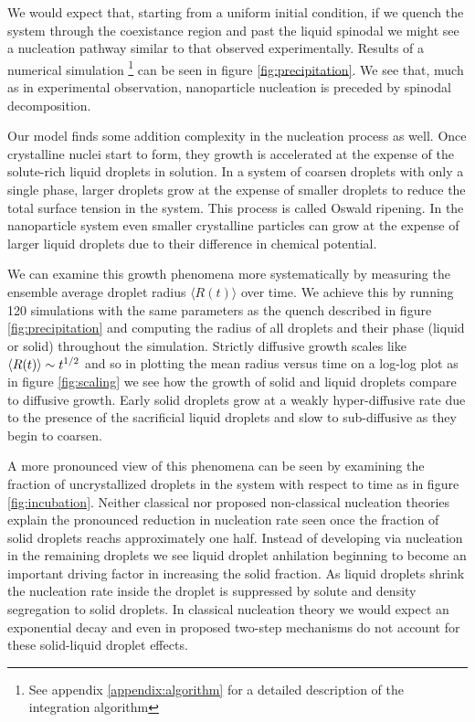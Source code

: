We would expect that, starting from a uniform initial condition, if we quench
the system through the coexistance region and past the liquid spinodal we might
see a nucleation pathway similar to that observed experimentally. Results of a
numerical simulation \footnote{See appendix \ref{appendix:algorithm} for a
detailed description of the integration algorithm} can be seen in figure
\ref{fig:precipitation}. We see that, much as in experimental observation,
nanoparticle nucleation is preceded by spinodal decomposition.


Our model finds some addition complexity in the nucleation process as well.
Once crystalline nuclei start to form, they growth is accelerated at the
expense of the solute-rich liquid droplets in solution. In a system of coarsen
droplets with only a single phase, larger droplets grow at the expense of
smaller droplets to reduce the total surface tension in the system. This
process is called Oswald ripening. In the nanoparticle system even smaller
crystalline particles can grow at the expense of larger liquid droplets due to
their difference in chemical potential.


We can examine this growth phenomena more systematically by measuring the
ensemble average droplet radius $\langle R(t) \rangle$ over time. We achieve
this by running 120 simulations with the same parameters as the quench
described in figure \ref{fig:precipitation} and computing the radius of all
droplets and their phase (liquid or solid) throughout the simulation. Strictly
diffusive growth scales like $\left\langle R(t) \right\rangle \sim t^{1/2}$ and so in plotting the
mean radius versus time on a log-log plot as in figure \ref{fig:scaling} we see
how the growth of solid and liquid droplets compare to diffusive growth. Early
solid droplets grow at a weakly hyper-diffusive rate due to the presence of
the sacrificial liquid droplets and slow to sub-diffusive as they begin to
coarsen.


A more pronounced view of this phenomena can be seen by examining the fraction
of uncrystallized droplets in the system with respect to time as in figure
\ref{fig:incubation}. Neither classical nor proposed non-classical nucleation
theories explain the pronounced reduction in nucleation rate seen once the
fraction of solid droplets reachs approximately one half. Instead of developing
via nucleation in the remaining droplets we see liquid droplet anhilation
beginning to become an important driving factor in increasing the solid
fraction. As liquid droplets shrink the nucleation rate inside the droplet is
suppressed by solute and density segregation to solid droplets. In classical
nucleation theory we would expect an exponential decay and even in proposed
two-step mechanisms do not account for these solid-liquid droplet
effects\cite{MYERSON04, MYERSON09}.


